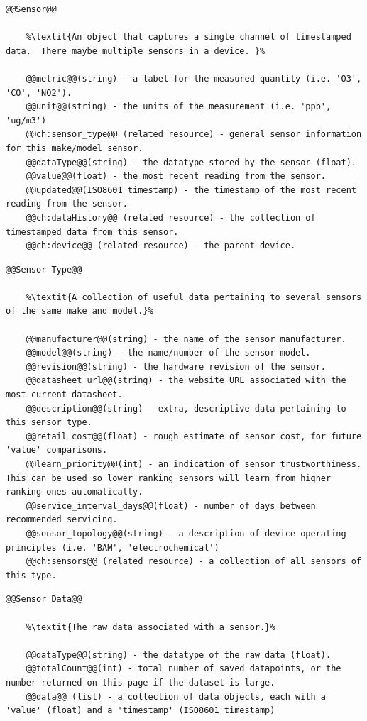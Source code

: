 \begin{lstlisting}[style=codedef]
@@Sensor@@
	
	%\textit{An object that captures a single channel of timestamped data.  There maybe multiple sensors in a device. }%

	@@metric@@(string) - a label for the measured quantity (i.e. 'O3', 'CO', 'NO2').
	@@unit@@(string) - the units of the measurement (i.e. 'ppb', 'ug/m3')
	@@ch:sensor_type@@ (related resource) - general sensor information for this make/model sensor.
	@@dataType@@(string) - the datatype stored by the sensor (float).
	@@value@@(float) - the most recent reading from the sensor.	
	@@updated@@(ISO8601 timestamp) - the timestamp of the most recent reading from the sensor.
	@@ch:dataHistory@@ (related resource) - the collection of timestamped data from this sensor.
	@@ch:device@@ (related resource) - the parent device.

\end{lstlisting}

\begin{lstlisting}[style=codedef]
@@Sensor Type@@
	
	%\textit{A collection of useful data pertaining to several sensors of the same make and model.}%

	@@manufacturer@@(string) - the name of the sensor manufacturer.
	@@model@@(string) - the name/number of the sensor model.
	@@revision@@(string) - the hardware revision of the sensor.
	@@datasheet_url@@(string) - the website URL associated with the most current datasheet.
	@@description@@(string) - extra, descriptive data pertaining to this sensor type.
	@@retail_cost@@(float) - rough estimate of sensor cost, for future 'value' comparisons.
	@@learn_priority@@(int) - an indication of sensor trustworthiness.  This can be used so lower ranking sensors will learn from higher ranking ones automatically.
	@@service_interval_days@@(float) - number of days between recommended servicing.
	@@sensor_topology@@(string) - a description of device operating principles (i.e. 'BAM', 'electrochemical')
	@@ch:sensors@@ (related resource) - a collection of all sensors of this type.

\end{lstlisting}

\begin{lstlisting}[style=codedef]
@@Sensor Data@@
	
	%\textit{The raw data associated with a sensor.}%

	@@dataType@@(string) - the datatype of the raw data (float).
	@@totalCount@@(int) - total number of saved datapoints, or the number returned on this page if the dataset is large.
	@@data@@ (list) - a collection of data objects, each with a 'value' (float) and a 'timestamp' (ISO8601 timestamp)

\end{lstlisting}

